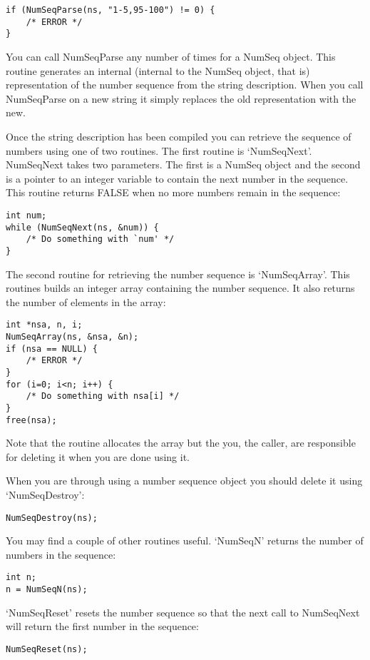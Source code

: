 \documentclass[letterpaper,twoside,10pt]{article}
\begin{document}
\begin{verbatim}
if (NumSeqParse(ns, "1-5,95-100") != 0) {
    /* ERROR */
}
\end{verbatim}
You can call NumSeqParse any number of times for a NumSeq object.  This
routine generates an internal (internal to the NumSeq object, that is)
representation of the number sequence from the string description.  When
you call NumSeqParse on a new string it simply replaces the old
representation with the new.

Once the string description has been compiled you can retrieve the sequence
of numbers using one of two routines.  The first routine is `NumSeqNext'.
NumSeqNext takes two parameters.  The first is a NumSeq object and the
second is a pointer to an integer variable to contain the next number in
the sequence.  This routine returns FALSE when no more numbers remain in
the sequence:
\begin{verbatim}
int num;
while (NumSeqNext(ns, &num)) {
    /* Do something with `num' */
}
\end{verbatim}
The second routine for retrieving the number sequence is `NumSeqArray'.
This routines builds an integer array containing the number sequence.  It
also returns the number of elements in the array:
\begin{verbatim}
int *nsa, n, i;
NumSeqArray(ns, &nsa, &n);
if (nsa == NULL) {
    /* ERROR */
}
for (i=0; i<n; i++) {
    /* Do something with nsa[i] */
}
free(nsa);
\end{verbatim}
Note that the routine allocates the array but the you, the caller, are
responsible for deleting it when you are done using it.

When you are through using a number sequence object you should delete it
using `NumSeqDestroy':
\begin{verbatim}
NumSeqDestroy(ns);
\end{verbatim}
You may find a couple of other routines useful.  `NumSeqN' returns the number
of numbers in the sequence:
\begin{verbatim}
int n;
n = NumSeqN(ns);
\end{verbatim}
`NumSeqReset' resets the number sequence so that the next call to
NumSeqNext will return the first number in the sequence:
\begin{verbatim}
NumSeqReset(ns);
\end{verbatim}
\end{document}
